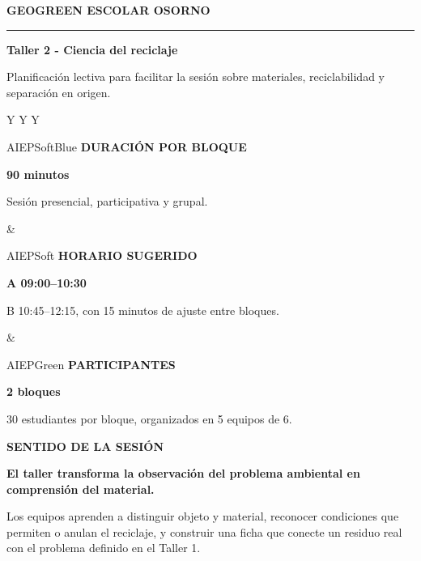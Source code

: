 ﻿\documentclass[10pt,a4paper]{article}
\newcommand{\kicker}[1]{%
  {\color{AIEPRed}\scriptsize\bfseries\MakeUppercase{#1}}\par\vspace{2.5mm}
  {\color{AIEPRed}\rule{13mm}{1.2pt}}\vspace{3mm}
}
\newcommand{\labeltext}[1]{%
  {\scriptsize\bfseries\color{AIEPSlate}\MakeUppercase{#1}}\par\vspace{1.3mm}
}
\begin{document}
\thispagestyle{fancy}
\kicker{GeoGreen Escolar Osorno}
{\Huge\bfseries\color{AIEPNavy} Taller 2 - Ciencia del reciclaje}\par
\vspace{2mm}
{\large\color{AIEPSlate} Planificación lectiva para facilitar la sesión sobre materiales, reciclabilidad y separación en origen.}\par
\vspace{6mm}

\begin{tabularx}{\textwidth}{Y Y Y}
\begin{softcard}[height=32mm,valign=top]{AIEPSoftBlue}
\labeltext{Duración por bloque}
{\Large\bfseries\color{AIEPNavy}90 minutos}\par
Sesión presencial, participativa y grupal.
\end{softcard}
&
\begin{softcard}[height=32mm,valign=top]{AIEPSoft}
\labeltext{Horario sugerido}
{\Large\bfseries\color{AIEPNavy}A 09:00--10:30}\par
B 10:45--12:15, con 15 minutos de ajuste entre bloques.
\end{softcard}
&
\begin{softcard}[height=32mm,valign=top]{AIEPGreen}
\labeltext{Participantes}
{\Large\bfseries\color{AIEPNavy}2 bloques}\par
30 estudiantes por bloque, organizados en 5 equipos de 6.
\end{softcard}
\end{tabularx}

\vspace{5mm}
\begin{tcolorbox}[
  enhanced,
  colback=AIEPNavy,
  colframe=AIEPNavy,
  boxrule=0pt,
  arc=1mm,
  left=5mm,
  right=5mm,
  top=4mm,
  bottom=4mm
]
{\color{White}\small\bfseries SENTIDO DE LA SESIÓN}\par\vspace{1.5mm}
{\color{White}\large\bfseries El taller transforma la observación del problema ambiental en comprensión del material.}\par
\vspace{1.5mm}
{\color{AIEPSoftBlue}Los equipos aprenden a distinguir objeto y material, reconocer condiciones que permiten o anulan el reciclaje, y construir una ficha que conecte un residuo real con el problema definido en el Taller 1.}
\end{tcolorbox}
\end{document}
